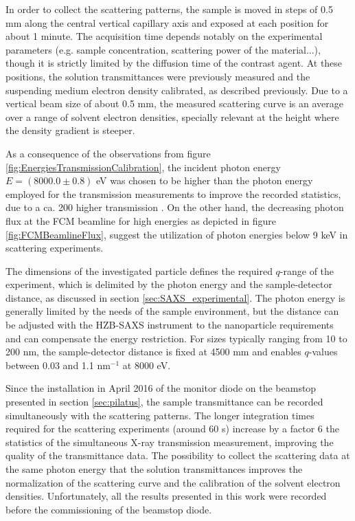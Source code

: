 In order to collect the scattering patterns, the sample is moved in steps of 0.5 mm along the central vertical capillary axis and exposed at each position for about 1 minute. The acquisition time depends notably on the experimental parameters (e.g. sample concentration, scattering power of the material...), though it is strictly limited by the diffusion time of the contrast agent. At these positions, the solution transmittances were previously measured and the suspending medium electron density calibrated, as described previously. Due to a vertical beam size of about 0.5 mm, the measured scattering curve is an average over a range of solvent electron densities, specially relevant at the height where the density gradient is steeper. 

As a consequence of the observations from figure \ref{fig:EnergiesTransmissionCalibration}, the incident photon energy \(E = \left(8000.0  \pm 0.8\right)\) eV was chosen to be higher than the photon energy employed for the transmission measurements to improve the recorded statistics, due to a ca. 200 higher transmission \citep{henke_x-ray_1993}. On the other hand, the decreasing photon flux at the FCM beamline for high energies as depicted in figure \ref{fig:FCMBeamlineFlux}, suggest the utilization of photon energies below 9 keV in scattering experiments.

The dimensions of the investigated particle defines the required $q$-range of the experiment, which is delimited by the photon energy and the sample-detector distance, as discussed in section \ref{sec:SAXS_experimental}. The photon energy is generally limited by the needs of the sample environment, but the distance can be adjusted with the HZB-SAXS instrument to the nanoparticle requirements and can compensate the energy restriction. For sizes typically ranging from 10 to 200 nm, the sample-detector distance is fixed at 4500 mm and enables $q$-values between 0.03 and 1.1 nm$^{-1}$ at 8000 eV.

Since the installation in April 2016 of the monitor diode on the beamstop presented in section \ref{sec:pilatus}, the sample transmittance can be recorded simultaneously with the scattering patterns. The longer integration times required for the scattering experiments (around 60 s) increase by a factor 6 the statistics of the simultaneous X-ray transmission measurement, improving the quality of the transmittance data. The possibility to collect the scattering data at the same photon energy that the solution transmittances improves the normalization of the scattering curve and the calibration of the solvent electron densities. Unfortunately, all the results presented in this work were recorded before the commissioning of the beamstop diode.

